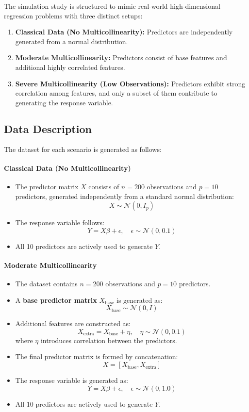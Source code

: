 \documentclass[11pt,twoside,a4paper]{article}
\begin{document}
The simulation study is structured to mimic real-world high-dimensional regression problems with three distinct setups:
\begin{enumerate}
    \item \textbf{Classical Data (No Multicollinearity):} Predictors are independently generated from a normal distribution.
    \item \textbf{Moderate Multicollinearity:} Predictors consist of base features and additional highly correlated features.
    \item \textbf{Severe Multicollinearity (Low Observations):} Predictors exhibit strong correlation among features, and only a subset of them contribute to generating the response variable.
\end{enumerate}

\subsection{Data Description}
The dataset for each scenario is generated as follows:

\paragraph{Classical Data (No Multicollinearity)}
\begin{itemize}
    \item The predictor matrix \( X \) consists of \( n = 200 \) observations and \( p = 10 \) predictors, generated independently from a standard normal distribution:
    \[ X \sim \mathcal{N}(0, I_p) \]
    \item The response variable follows:
    \[ Y = X \beta + \epsilon, \quad \epsilon \sim \mathcal{N}(0, 0.1) \]
    \item All 10 predictors are actively used to generate \( Y \).
\end{itemize}

\paragraph{Moderate Multicollinearity}
\begin{itemize}
    \item The dataset contains \( n = 200 \) observations and \( p = 10 \) predictors.
    \item A \textbf{base predictor matrix} \( X_{\text{base}} \) is generated as:
    \[ X_{\text{base}} \sim \mathcal{N}(0, I) \]
    \item Additional features are constructed as:
    \[ X_{\text{extra}} = X_{\text{base}} + \eta, \quad \eta \sim \mathcal{N}(0, 0.1) \]
    where \( \eta \) introduces correlation between the predictors.
    \item The final predictor matrix is formed by concatenation:
    \[ X = [X_{\text{base}}, X_{\text{extra}}] \]
    \item The response variable is generated as:
    \[ Y = X \beta + \epsilon, \quad \epsilon \sim \mathcal{N}(0, 1.0) \]
    \item All 10 predictors are actively used to generate \( Y \).
\end{itemize}
\end{document}
